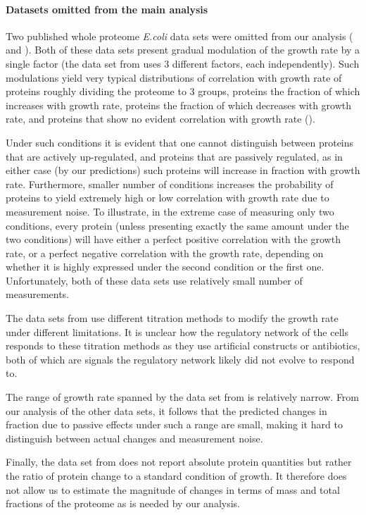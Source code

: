 \documentclass[10pt,letterpaper]{article}
\begin{document}
\paragraph{Datasets omitted from the main analysis}
Two published whole proteome \emph{E.coli} data sets were omitted from our analysis (\cite{Valgepea2013} and \cite{Hui_2015}).
Both of these data sets present gradual modulation of the growth rate by a single factor (the data set from \cite{Hui_2015} uses 3 different factors, each independently).
Such modulations yield very typical distributions of correlation with growth rate of proteins roughly dividing the proteome to 3 groups, proteins the fraction of which increases with growth rate, proteins the fraction of which decreases with growth rate, and proteins that show no evident correlation with growth rate ().

Under such conditions it is evident that one cannot distinguish between proteins that are actively up-regulated, and proteins that are passively regulated, as in either case (by our predictions) such proteins will increase in fraction with growth rate.
Furthermore, smaller number of conditions increases the probability of proteins to yield extremely high or low correlation with growth rate due to measurement noise.
To illustrate, in the extreme case of measuring only two conditions, every protein (unless presenting exactly the same amount under the two conditions) will have either a perfect positive correlation with the growth rate, or a perfect negative correlation with the growth rate, depending on whether it is highly expressed under the second condition or the first one.
Unfortunately, both of these data sets use relatively small number of measurements.

The data sets from \cite{Hui_2015} use different titration methods to modify the growth rate under different limitations.
It is unclear how the regulatory network of the cells responds to these titration methods as they use artificial constructs or antibiotics, both of which are signals the regulatory network likely did not evolve to respond to.

The range of growth rate spanned by the data set from \cite{Hui_2015} is relatively narrow.
From our analysis of the other data sets, it follows that the predicted changes in fraction due to passive effects under such a range are small, making it hard to distinguish between actual changes and measurement noise.

Finally, the data set from \cite{Hui_2015} does not report absolute protein quantities but rather the ratio of protein change to a standard condition of growth.
It therefore does not allow us to estimate the magnitude of changes in terms of mass and total fractions of the proteome as is needed by our analysis.
\end{document}
